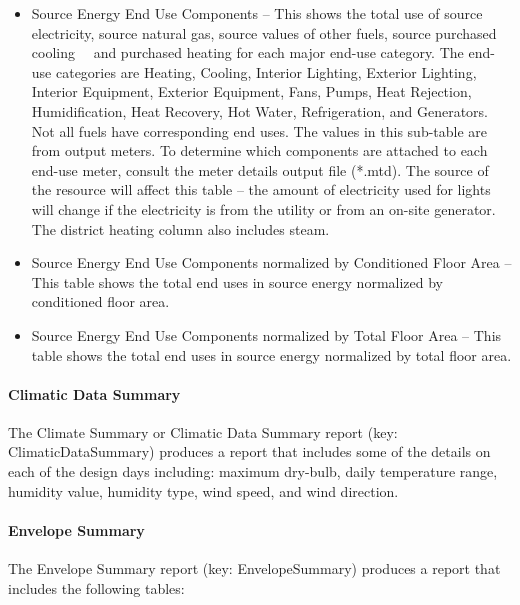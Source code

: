 \begin{itemize}
\item
  Source Energy End Use Components -- This shows the total use of source electricity, source natural gas, source values of other fuels, source purchased cooling~~ and purchased heating for each major end-use category. The end-use categories are Heating, Cooling, Interior Lighting, Exterior Lighting, Interior Equipment, Exterior Equipment, Fans, Pumps, Heat Rejection, Humidification, Heat Recovery, Hot Water, Refrigeration, and Generators. Not all fuels have corresponding end uses. The values in this sub-table are from output meters. To determine which components are attached to each end-use meter, consult the meter details output file (*.mtd). The source of the resource will affect this table -- the amount of electricity used for lights will change if the electricity is from the utility or from an on-site generator. The district heating column also includes steam.
\item
  Source Energy End Use Components normalized by Conditioned Floor Area -- This table shows the total end uses in source energy normalized by conditioned floor area.
\item
  Source Energy End Use Components normalized by Total Floor Area -- This table shows the total end uses in source energy normalized by total floor area.
\end{itemize}

\paragraph{Climatic Data Summary}\label{climatic-data-summary}

The Climate Summary or Climatic Data Summary report (key: ClimaticDataSummary) produces a report that includes some of the details on each of the design days including: maximum dry-bulb, daily temperature range, humidity value, humidity type, wind speed, and wind direction.

\paragraph{Envelope Summary}\label{envelope-summary}

The Envelope Summary report (key: EnvelopeSummary) produces a report that includes the following tables:

